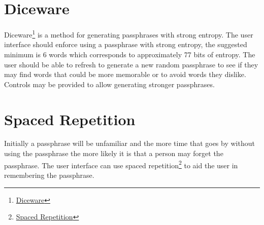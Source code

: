 \documentclass[a4paper,titlepage,oneside]{article}
\renewcommand{\paragraph}{\small}
\begin{document}
\section{Diceware}

\paragraph{Diceware\footnote{\href{https://en.wikipedia.org/wiki/Diceware}{Diceware}} is a method for generating passphrases with strong entropy. The user interface should enforce using a passphrase with strong entropy, the suggested minimum is 6 words which corresponds to approximately 77 bits of entropy. The user should be able to refresh to generate a new random passphrase to see if they may find words that could be more memorable or to avoid words they dislike. Controls may be provided to allow generating stronger passphrases.}

\section{Spaced Repetition}

\paragraph{Initially a passphrase will be unfamiliar and the more time that goes by without using the passphrase the more likely it is that a person may forget the passphrase. The user interface can use spaced repetition\footnote{\href{https://en.wikipedia.org/wiki/Spaced_repetition}{Spaced Repetition}} to aid the user in remembering the passphrase.}
\end{document}
